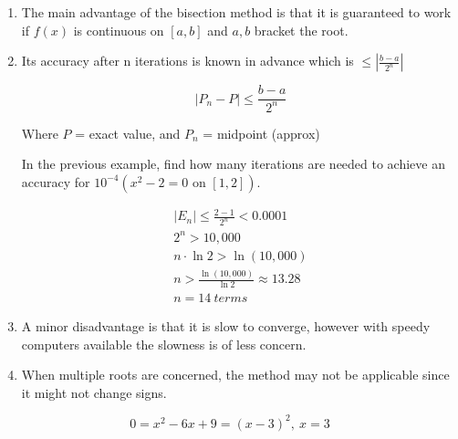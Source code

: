 \documentclass[]{article}
\begin{document}
\begin{enumerate}
	
	\item The main advantage of the bisection method is that it is guaranteed to work if $ f(x) $ is continuous on $ [a,b] $ and $ a,b $ bracket the root.
		
	 \item Its accuracy after n iterations is known in advance which is $ \le |\frac{b-a}{2^n}| $
	
	\[ |P_n - P| \le \frac{b-a}{2^n} \]
	
	Where $ P $ = exact value, and $ P_n $ = midpoint (approx)
	
	In the previous example, find how many iterations are needed to achieve an accuracy for $ 10^{-4}  (x^2 - 2 = 0  \text{ on }  [1,2])$.
	
	
	\begin{align*}
	 |E_n| \le \frac{2-1}{2^n} < 0.0001 \\
	 2^n > 10,000 \\
	 n \cdot \ln2 > \ln(10,000) \\
	 n > \frac{\ln(10,000)}{\ln2} \approx 13.28 \\
	 n = 14 \ terms
	\end{align*}
	
	\item A minor disadvantage is that it is slow to converge, however with speedy computers available the slowness is of less concern. 
	
	\item When multiple roots are concerned, the method may not be applicable since it might not change signs. 
\end{enumerate}	

\[ 	0 = x^2 - 6x + 9 = (x-3)^2, \  x = 3  \]
	
\end{document}
